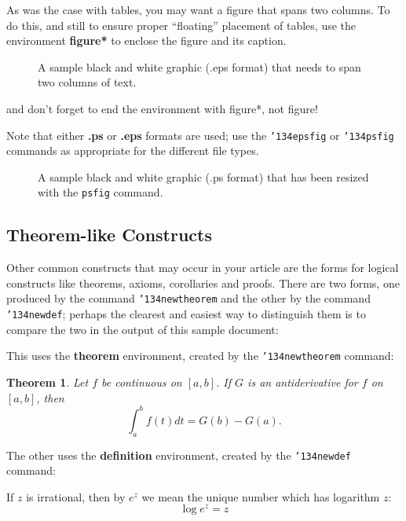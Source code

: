 \documentclass{sig-alternate2-pods09}
\begin{document}
As was the case with tables, you may want a figure
that spans two columns.  To do this, and still to
ensure proper ``floating'' placement of tables, use the environment
\textbf{figure*} to enclose the figure and its caption.
\begin{figure}
\centering
{}
\caption{A sample black and white graphic (.eps format)
that needs to span two columns of text.}
\end{figure}
and don't forget to end the environment with
{figure*}, not {figure}!

Note that either {\textbf{.ps}} or {\textbf{.eps}} formats are
used; use
the \texttt{{\char'134}epsfig} or \texttt{{\char'134}psfig}
commands as appropriate for the different file types.

\begin{figure}
\centering
{}
\caption{A sample black and white graphic (.ps format) that has
been resized with the \texttt{psfig} command.}
\end{figure}

\subsection{Theorem-like Constructs}
Other common constructs that may occur in your article are
the forms for logical constructs like theorems, axioms,
corollaries and proofs.  There are
two forms, one produced by the
command \texttt{{\char'134}newtheorem} and the
other by the command \texttt{{\char'134}newdef}; perhaps
the clearest and easiest way to distinguish them is
to compare the two in the output of this sample document:

This uses the \textbf{theorem} environment, created by
the \texttt{{\char'134}newtheorem} command:
\newtheorem{theorem}{Theorem}
\begin{theorem}
Let $f$ be continuous on $[a,b]$.  If $G$ is
an antiderivative for $f$ on $[a,b]$, then
\begin{displaymath}\int^b_af(t)dt = G(b) - G(a).\end{displaymath}
\end{theorem}

The other uses the \textbf{definition} environment, created
by the \texttt{{\char'134}newdef} command:
\begin{definition}
If $z$ is irrational, then by $e^z$ we mean the
unique number which has
logarithm $z$: \begin{displaymath}{\log e^z = z}\end{displaymath}
\end{definition}
\end{document}
